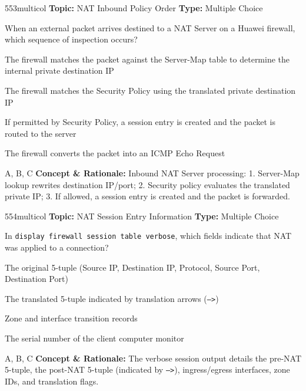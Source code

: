 \begin{qcard}{553}{multicol}
\textcolor{darkslate!75}{\small\textbf{Topic:} NAT Inbound Policy Order \hfill \textbf{Type:} Multiple Choice}\vspace{0.4em}\par
When an external packet arrives destined to a NAT Server on a Huawei firewall, which sequence of inspection occurs?
\begin{qoptions}
\item The firewall matches the packet against the Server-Map table to determine the internal private destination IP
\item The firewall matches the Security Policy using the translated private destination IP
\item If permitted by Security Policy, a session entry is created and the packet is routed to the server
\item The firewall converts the packet into an ICMP Echo Request
\end{qoptions}
\end{qcard}
\nopagebreak
\begin{explainbox}{A, B, C}
\textbf{Concept \& Rationale:} Inbound NAT Server processing: 1. Server-Map lookup rewrites destination IP/port; 2. Security policy evaluates the translated private IP; 3. If allowed, a session entry is created and the packet is forwarded.
\end{explainbox}

\begin{qcard}{554}{multicol}
\textcolor{darkslate!75}{\small\textbf{Topic:} NAT Session Entry Information \hfill \textbf{Type:} Multiple Choice}\vspace{0.4em}\par
In \texttt{display firewall session table verbose}, which fields indicate that NAT was applied to a connection?
\begin{qoptions}
\item The original 5-tuple (Source IP, Destination IP, Protocol, Source Port, Destination Port)
\item The translated 5-tuple indicated by translation arrows (\texttt{--\textgreater{}})
\item Zone and interface transition records
\item The serial number of the client computer monitor
\end{qoptions}
\end{qcard}
\nopagebreak
\begin{explainbox}{A, B, C}
\textbf{Concept \& Rationale:} The verbose session output details the pre-NAT 5-tuple, the post-NAT 5-tuple (indicated by \texttt{--\textgreater{}}), ingress/egress interfaces, zone IDs, and translation flags.
\end{explainbox}

